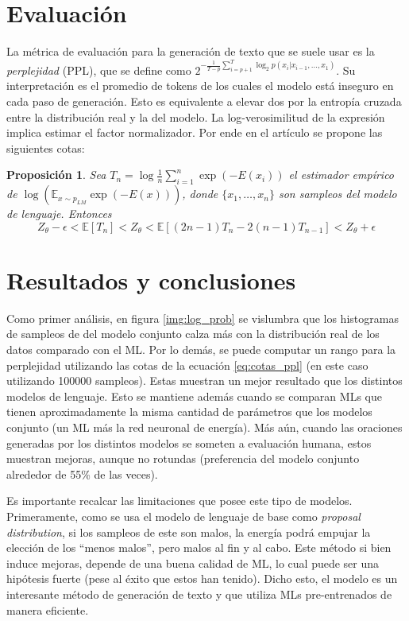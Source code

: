 \documentclass[letterpaper,11pt,oneside]{article}
\theoremstyle{break}
\newtheorem{proposition}{Proposición}[subsection]
\begin{document}
\section{Evaluación}
La métrica de evaluación para la generación de texto que se suele usar es la \textit{perplejidad} (PPL), que se define como $2^{-\frac{1}{T-p}\sum^T_{i=p+1}\log_2p(x_i|x_{i-1},\dots,x_1)}$. Su interpretación es el promedio de tokens de los cuales el modelo está inseguro en cada paso de generación. Esto es equivalente a elevar dos por la entropía cruzada entre la distribución real y la del modelo. La log-verosimilitud de la expresión implica estimar el factor normalizador. Por ende en el artículo se propone las siguientes cotas:
\begin{proposition}
\label{prop:cotas_ppl}
    Sea $T_n=\log \frac{1}{n}\sum^n_{i=1}\exp(-E(x_i))$ el estimador empírico de $\log (\mathbb{E}_{x\sim p_{LM}}\exp(-E(x)))$, donde $\{x_1,\dots,x_n\}$ son sampleos del modelo de lenguaje. Entonces
    \begin{equation}
    \label{eq:cotas_ppl}
        Z_\theta-\epsilon < \mathbb{E}[T_n] < Z_\theta < \mathbb{E}[(2n-1)T_n-2(n-1)T_{n-1}] < Z_\theta + \epsilon
    \end{equation}
\end{proposition}

\section{Resultados y conclusiones}
Como primer análisis, en figura \ref{img:log_prob} se vislumbra que los histogramas de sampleos de del modelo conjunto calza más con la distribución real de los datos comparado con el ML.
Por lo demás, se puede computar un rango para la perplejidad utilizando las cotas de la ecuación \ref{eq:cotas_ppl} (en este caso utilizando 100000 sampleos). Estas muestran un mejor resultado que los distintos modelos de lenguaje. Esto se mantiene además cuando se comparan MLs que tienen aproximadamente la misma cantidad de parámetros que los modelos conjunto (un ML más la red neuronal de energía). Más aún, cuando las oraciones generadas por los distintos modelos se someten a evaluación humana, estos muestran mejoras, aunque no rotundas (preferencia del modelo conjunto alrededor de 55\% de las veces).

\newp Es importante recalcar las limitaciones que posee este tipo de modelos. Primeramente, como se usa el modelo de lenguaje de base como \textit{proposal distribution}, si los sampleos de este son malos, la energía podrá empujar la elección de los ``menos malos'', pero malos al fin y al cabo. Este método si bien induce mejoras, depende de una buena calidad de ML, lo cual puede ser una hipótesis fuerte (pese al éxito que estos han tenido). Dicho esto, el modelo es un interesante método de generación de texto y que utiliza MLs pre-entrenados de manera eficiente.
\end{document}

